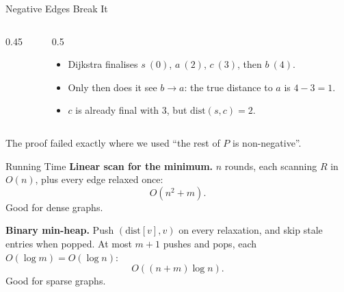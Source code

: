 \documentclass[10pt,aspectratio=169]{beamer}
\begin{document}
\begin{frame}{Negative Edges Break It}
  \begin{columns}[c]
    \begin{column}{0.45\textwidth}
      \begin{center}
      \end{center}
    \end{column}
    \begin{column}{0.5\textwidth}
      \begin{itemize}
        \item Dijkstra finalises $s\ (0)$, $a\ (2)$, $c\ (3)$, then $b\ (4)$.
        \item Only then does it see $b \to a$: the true distance to $a$ is
              $4 - 3 = 1$.
        \item $c$ is already final with $3$, but $\text{dist}(s, c) = 2$.
      \end{itemize}
    \end{column}
  \end{columns}

  \bigskip
  \begin{center}
    The proof failed exactly where we used ``the rest of $P$ is
    non-negative''.
  \end{center}
\end{frame}

\begin{frame}{Running Time}
  \textbf{Linear scan for the minimum.} $n$ rounds, each scanning $R$ in
  $O(n)$, plus every edge relaxed once:
  \[
    O(n^2 + m).
  \]
  Good for \alert{dense} graphs.

  \pause
  \bigskip
  \textbf{Binary min-heap.} Push $(\text{dist}[v], v)$ on every relaxation,
  and skip \alert{stale} entries when popped. At most $m + 1$ pushes and pops,
  each $O(\log m) = O(\log n)$:
  \[
    O((n + m) \log n).
  \]
  Good for \alert{sparse} graphs.
\end{frame}
\end{document}
